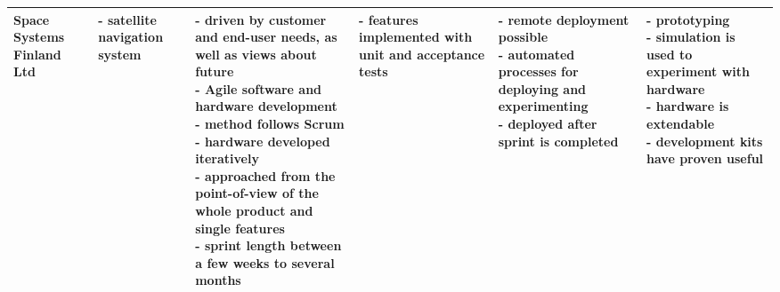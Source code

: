 \documentclass[english]{tktltiki2}
\begin{document}
\begin{landscape}
\begin{longtable}{|p{2.5cm}|p{1.5cm}|p{4cm}|p{4cm}|p{4cm}|p{4cm}|}
        Space Systems Finland Ltd &
        \parbox[t]{1.5cm}{- satellite navigation system} &
        \parbox[t]{4cm}{- driven by customer and end-user needs, as well as views about future \\
                        - Agile software and hardware development \\
                        - method follows Scrum \\
                        - hardware developed iteratively \\
                        - approached from the point-of-view of the whole product and single features \\
                        - sprint length between a few weeks to several months} &
        \parbox[t]{4cm}{- features implemented with unit and acceptance tests} &
        \parbox[t]{4cm}{- remote deployment possible \\
                        - automated processes for deploying and experimenting \\
                        - deployed after sprint is completed} &
        \parbox[t]{4cm}{- prototyping \\
                        - simulation is used to experiment with hardware \\
                        - hardware is extendable \\
                        - development kits have proven useful} \\

        \hline


\end{longtable}
\end{landscape}
\end{document}
